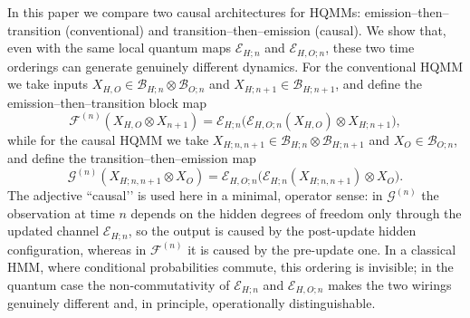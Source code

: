 \documentclass[11pt, reco]{article}
\begin{document}
In this paper we compare two causal architectures for HQMMs: emission–then–transition (conventional) and  transition–then–emission (causal). We show that, even with the same local quantum maps $\mathcal{E}_{H;n}$ and $\mathcal{E}_{H,O;n}$, these two time orderings can generate genuinely different dynamics. For the conventional HQMM we take inputs \(X_{H,O}\in \mathcal{B}_{H;n}\otimes\mathcal{B}_{O;n}\) and \(X_{H; n+1}\in\mathcal{B}_{H;n+1}\), and define the emission–then–transition block map
\[
\mathcal{F}^{(n)}(X_{H,O}\otimes X_{n+1})
=
\mathcal{E}_{H;n}\bigl(\mathcal{E}_{H,O;n}(X_{H,O})\otimes X_{H; n+1}\bigr),
\]
while for the causal HQMM we take \(X_{H; n,n+1}\in\mathcal{B}_{H;n}\otimes\mathcal{B}_{H; n+1}\) and \(X_{O}\in\mathcal{B}_{O;n}\), and define the transition–then–emission map
\[
\mathcal{G}^{(n)}(X_{H;n,n+1}\otimes X_{O})
=
\mathcal{E}_{H,O;n}\bigl(\mathcal{E}_{H;n}(X_{H; n,n+1})\otimes X_{O}\bigr).
\]
The adjective “causal’’ is used here in a minimal, operator sense: in \(\mathcal{G}^{(n)}\) the observation at time \(n\) depends on the hidden degrees of freedom only through the updated channel \(\mathcal{E}_{H;n}\), so the output is caused by the post-update hidden configuration, whereas in \(\mathcal{F}^{(n)}\) it is caused by the pre-update one. In a classical HMM, where conditional probabilities commute, this ordering is invisible; in the quantum case the non-commutativity of \(\mathcal{E}_{H;n}\) and \(\mathcal{E}_{H,O;n}\) makes the two wirings genuinely different and, in principle, operationally distinguishable.
\end{document}
